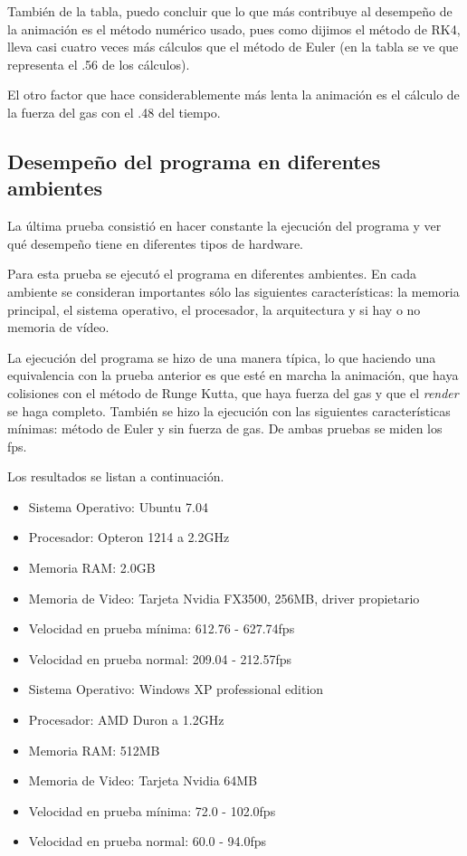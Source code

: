 También de la tabla, puedo concluir  que lo que más contribuye al desempeño de la animación es el método numérico usado, pues como dijimos el
método de RK4, lleva casi cuatro veces más cálculos que el método de Euler (en la tabla se ve que representa el .56 de los cálculos).

El otro factor que hace considerablemente más lenta la animación es el cálculo de la fuerza del gas con el .48 del tiempo.

\subsection{Desempeño del programa en diferentes ambientes}

La última prueba consistió en hacer constante la ejecución del programa y ver qué desempeño tiene en diferentes tipos de hardware.

Para esta  prueba se ejecutó el programa en diferentes ambientes.
En cada ambiente se consideran importantes sólo las siguientes características: la memoria principal, el sistema operativo, el procesador, la arquitectura y si hay o no memoria de vídeo.

La ejecución del programa se hizo de una manera típica, lo que haciendo una equivalencia con la prueba anterior es que esté en marcha la animación, que haya colisiones con el método de Runge Kutta, que haya fuerza del gas y que el \emph{\textenglish{render}} se haga completo.
También se hizo la ejecución con las siguientes características mínimas: método de Euler y sin fuerza de gas.
De ambas pruebas se miden los fps.

Los resultados se listan a continuación.
\begin{itemize}
 \item Sistema Operativo: Ubuntu 7.04
 \item Procesador: Opteron 1214 a 2.2GHz
 \item Memoria RAM: 2.0GB
 \item Memoria de Video: Tarjeta Nvidia FX3500, 256MB, driver propietario
 \item Velocidad en prueba mínima: 612.76 - 627.74fps
 \item Velocidad en prueba normal: 209.04 - 212.57fps
\end{itemize}

\begin{itemize}
 \item Sistema Operativo: Windows XP professional edition
 \item Procesador: AMD Duron a 1.2GHz
 \item Memoria RAM: 512MB
 \item Memoria de Video: Tarjeta Nvidia 64MB
 \item Velocidad en prueba mínima: 72.0 - 102.0fps
 \item Velocidad en prueba normal: 60.0 - 94.0fps
\end{itemize}

